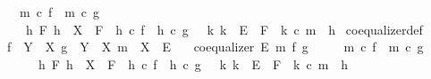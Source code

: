 \begin{isabellebody}
\ \ \ \ {\isasymand}\ {\isacharparenleft}{\kern0pt}m\ {\isasymcirc}\isactrlsub c\ f\ {\isacharequal}{\kern0pt}\ m\ {\isasymcirc}\isactrlsub c\ g{\isacharparenright}{\kern0pt}\isanewline
\ \ \ \ {\isasymand}\ {\isacharparenleft}{\kern0pt}{\isasymforall}\ h\ F{\isachardot}{\kern0pt}\ {\isacharparenleft}{\kern0pt}{\isacharparenleft}{\kern0pt}h\ {\isacharcolon}{\kern0pt}\ X\ {\isasymrightarrow}\ F{\isacharparenright}{\kern0pt}\ {\isasymand}\ {\isacharparenleft}{\kern0pt}h\ {\isasymcirc}\isactrlsub c\ f\ {\isacharequal}{\kern0pt}\ h\ {\isasymcirc}\isactrlsub c\ g{\isacharparenright}{\kern0pt}{\isacharparenright}{\kern0pt}\ {\isasymlongrightarrow}\ {\isacharparenleft}{\kern0pt}{\isasymexists}{\isacharbang}{\kern0pt}\ k{\isachardot}{\kern0pt}\ {\isacharparenleft}{\kern0pt}k\ {\isacharcolon}{\kern0pt}\ E\ {\isasymrightarrow}\ F{\isacharparenright}{\kern0pt}\ {\isasymand}\ k\ {\isasymcirc}\isactrlsub c\ m\ {\isacharequal}{\kern0pt}\ h{\isacharparenright}{\kern0pt}{\isacharparenright}{\kern0pt}{\isacharparenright}{\kern0pt}{\isachardoublequoteclose}\isanewline
\isanewline
{}\isamarkupfalse%
\ coequalizer{\isacharunderscore}{\kern0pt}def{}{\isacharcolon}{\kern0pt}\isanewline
\ \ \ {\isachardoublequoteopen}f\ {\isacharcolon}{\kern0pt}\ Y\ {\isasymrightarrow}\ X{\isachardoublequoteclose}\ {\isachardoublequoteopen}g\ {\isacharcolon}{\kern0pt}\ Y\ {\isasymrightarrow}\ X{\isachardoublequoteclose}\ {\isachardoublequoteopen}m\ {\isacharcolon}{\kern0pt}\ X\ {\isasymrightarrow}\ E{\isachardoublequoteclose}\isanewline
\ \ \ {\isachardoublequoteopen}coequalizer\ E\ m\ f\ g\ {\isasymlongleftrightarrow}\isanewline
\ \ \ \ {\isacharparenleft}{\kern0pt}m\ {\isasymcirc}\isactrlsub c\ f\ {\isacharequal}{\kern0pt}\ m\ {\isasymcirc}\isactrlsub c\ g{\isacharparenright}{\kern0pt}\isanewline
\ \ \ \ \ \ {\isasymand}\ {\isacharparenleft}{\kern0pt}{\isasymforall}\ h\ F{\isachardot}{\kern0pt}\ {\isacharparenleft}{\kern0pt}{\isacharparenleft}{\kern0pt}h\ {\isacharcolon}{\kern0pt}\ X\ {\isasymrightarrow}\ F{\isacharparenright}{\kern0pt}\ {\isasymand}\ {\isacharparenleft}{\kern0pt}h\ {\isasymcirc}\isactrlsub c\ f\ {\isacharequal}{\kern0pt}\ h\ {\isasymcirc}\isactrlsub c\ g{\isacharparenright}{\kern0pt}{\isacharparenright}{\kern0pt}\ {\isasymlongrightarrow}\ {\isacharparenleft}{\kern0pt}{\isasymexists}{\isacharbang}{\kern0pt}\ k{\isachardot}{\kern0pt}\ {\isacharparenleft}{\kern0pt}k\ {\isacharcolon}{\kern0pt}\ E\ {\isasymrightarrow}\ F{\isacharparenright}{\kern0pt}\ {\isasymand}\ k\ {\isasymcirc}\isactrlsub c\ m\ {\isacharequal}{\kern0pt}\ h{\isacharparenright}{\kern0pt}{\isacharparenright}{\kern0pt}{\isachardoublequoteclose}\isanewline

\end{isabellebody}
